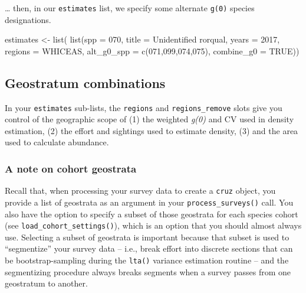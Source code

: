 \documentclass[
]{book}
\newenvironment{Shaded}{\begin{snugshade}}{\end{snugshade}}
\newcommand{\AttributeTok}[1]{\textcolor[rgb]{0.77,0.63,0.00}{#1}}
\newcommand{\ConstantTok}[1]{\textcolor[rgb]{0.00,0.00,0.00}{#1}}
\newcommand{\DecValTok}[1]{\textcolor[rgb]{0.00,0.00,0.81}{#1}}
\newcommand{\FunctionTok}[1]{\textcolor[rgb]{0.00,0.00,0.00}{#1}}
\newcommand{\NormalTok}[1]{#1}
\newcommand{\OtherTok}[1]{\textcolor[rgb]{0.56,0.35,0.01}{#1}}
\newcommand{\StringTok}[1]{\textcolor[rgb]{0.31,0.60,0.02}{#1}}
\begin{document}
\ldots{} then, in our \texttt{estimates} list, we specify some alternate \texttt{g(0)} species designations.

\begin{Shaded}
\begin{Highlighting}[]
\NormalTok{estimates }\OtherTok{\textless{}{-}} \FunctionTok{list}\NormalTok{(}
    \FunctionTok{list}\NormalTok{(}\AttributeTok{spp =} \StringTok{\textquotesingle{}070\textquotesingle{}}\NormalTok{,}
         \AttributeTok{title =} \StringTok{\textquotesingle{}Unidentified rorqual\textquotesingle{}}\NormalTok{,}
         \AttributeTok{years =} \DecValTok{2017}\NormalTok{,}
         \AttributeTok{regions =} \StringTok{\textquotesingle{}WHICEAS\textquotesingle{}}\NormalTok{,}
         \AttributeTok{alt\_g0\_spp =} \FunctionTok{c}\NormalTok{(}\StringTok{\textquotesingle{}071\textquotesingle{}}\NormalTok{,}\StringTok{\textquotesingle{}099\textquotesingle{}}\NormalTok{,}\StringTok{\textquotesingle{}074\textquotesingle{}}\NormalTok{,}\StringTok{\textquotesingle{}075\textquotesingle{}}\NormalTok{),}
         \AttributeTok{combine\_g0 =} \ConstantTok{TRUE}\NormalTok{))}
\end{Highlighting}
\end{Shaded}

\hypertarget{geostratum-combinations}{%
\subsection*{Geostratum combinations}\label{geostratum-combinations}}

In your \texttt{estimates} sub-lists, the \texttt{regions} and \texttt{regions\_remove} slots give you control of the geographic scope of (1) the weighted \emph{g(0)} and CV used in density estimation, (2) the effort and sightings used to estimate density, (3) and the area used to calculate abundance.

\hypertarget{a-note-on-cohort-geostrata}{%
\subsubsection*{A note on cohort geostrata}\label{a-note-on-cohort-geostrata}}

Recall that, when processing your survey data to create a \texttt{cruz} object, you provide a list of geostrata as an argument in your \texttt{process\_surveys()} call. You also have the option to specify a subset of those geostrata for each species cohort (see \texttt{load\_cohort\_settings()}), which is an option that you should almost always use. Selecting a subset of geostrata is important because that subset is used to ``segmentize'' your survey data -- i.e., break effort into discrete sections that can be bootstrap-sampling during the \texttt{lta()} variance estimation routine -- and the segmentizing procedure always breaks segments when a survey passes from one geostratum to another.
\end{document}

